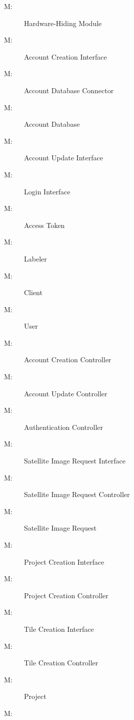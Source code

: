 \documentclass[12pt, titlepage]{article}
\newcounter{mnum}
\newcommand{\mthemnum}{M\themnum}
\begin{document}
\begin{description}



\item [ \mthemnum \label{mHH}:] Hardware-Hiding Module
\item [ \mthemnum \label{aci}:]
Account Creation Interface
\item [ \mthemnum \label{accdc}:]
Account Database Connector
\item [ \mthemnum \label{accd}:]
Account Database
\item [ \mthemnum \label{aui}:]
Account Update Interface
\item [ \mthemnum \label{li}:]
Login Interface
\item [ \mthemnum \label{at}:]
Access Token
\item [ \mthemnum \label{labeler}:]
Labeler
\item [ \mthemnum \label{client}:]
Client
\item [ \mthemnum \label{user}:]
User
\item [ \mthemnum \label{acc}:]
Account Creation Controller
\item [ \mthemnum \label{auc}:]
Account Update Controller
\item [ \mthemnum \label{ac}:]
Authentication Controller
\item [ \mthemnum \label{siri}:]
Satellite Image Request Interface
\item [ \mthemnum \label{sirc}:]
Satellite Image Request Controller
\item [ \mthemnum \label{sirf}:]
Satellite Image Request
\item [ \mthemnum \label{pci}:]
Project Creation Interface
\item [ \mthemnum \label{pcc}:]
Project Creation Controller
\item [ \mthemnum \label{tci}:]
Tile Creation Interface
\item [ \mthemnum \label{tcc}:]
Tile Creation Controller
\item [ \mthemnum \label{project}:]
Project
\item [ \mthemnum \label{srfi}:]

\end{description}
\end{document}
